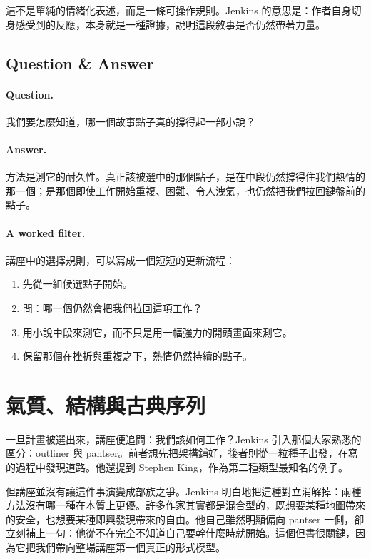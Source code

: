 這不是單純的情緒化表述，而是一條可操作規則。Jenkins 的意思是：作者自身切身感受到的反應，本身就是一種證據，說明這段敘事是否仍然帶著力量。

\subsection{Question \& Answer}

\paragraph{Question.} 我們要怎麼知道，哪一個故事點子真的撐得起一部小說？

\paragraph{Answer.} 方法是測它的耐久性。真正該被選中的那個點子，是在中段仍然撐得住我們熱情的那一個；是那個即使工作開始重複、困難、令人洩氣，也仍然把我們拉回鍵盤前的點子。

\paragraph{A worked filter.} 講座中的選擇規則，可以寫成一個短短的更新流程：

\begin{enumerate}
\item 先從一組候選點子開始。
\item 問：哪一個仍然會把我們拉回這項工作？
\item 用小說中段來測它，而不只是用一幅強力的開頭畫面來測它。
\item 保留那個在挫折與重複之下，熱情仍然持續的點子。
\end{enumerate}

\section{氣質、結構與古典序列}

一旦計畫被選出來，講座便追問：我們該如何工作？Jenkins 引入那個大家熟悉的區分：outliner 與 pantser。前者想先把架構鋪好，後者則從一粒種子出發，在寫的過程中發現道路。他還提到 Stephen King，作為第二種類型最知名的例子。

但講座並沒有讓這件事演變成部族之爭。Jenkins 明白地把這種對立消解掉：兩種方法沒有哪一種在本質上更優。許多作家其實都是混合型的，既想要某種地圖帶來的安全，也想要某種即興發現帶來的自由。他自己雖然明顯偏向 pantser 一側，卻立刻補上一句：他從不在完全不知道自己要幹什麼時就開始。這個但書很關鍵，因為它把我們帶向整場講座第一個真正的形式模型。

